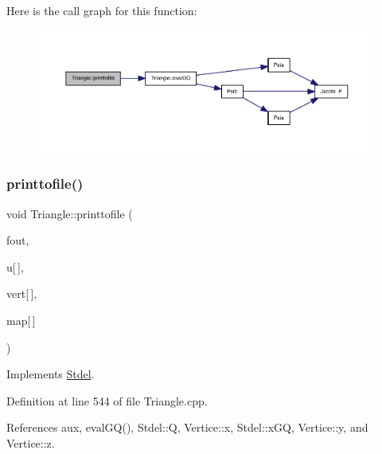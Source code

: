 Here is the call graph for this function\+:
\nopagebreak
\begin{figure}[H]
\begin{center}
\leavevmode
\includegraphics[width=350pt]{classTriangle_a404774b49104b12d072c9c103f9c357c_cgraph}
\end{center}
\end{figure}
\mbox{\label{classTriangle_ab95679ba1b3e20ac9e585ffe409f7972}} 
\subsubsection{\texorpdfstring{printtofile()}{printtofile()}\hspace{0.1cm}{\footnotesize\ttfamily [2/2]}}
{\footnotesize\ttfamily void Triangle\+::printtofile (\begin{DoxyParamCaption}\item[{F\+I\+LE $\ast$}]{fout,  }\item[{const double}]{u\mbox{[}$\,$\mbox{]},  }\item[{const \hyperlink{structVertice}{Vertice}}]{vert\mbox{[}$\,$\mbox{]},  }\item[{const int}]{map\mbox{[}$\,$\mbox{]} }\end{DoxyParamCaption})\hspace{0.3cm}{\ttfamily [virtual]}}



Implements \hyperlink{classStdel_a6863f8aeb8e4fb01299b109b0dd3fe13}{Stdel}.



Definition at line 544 of file Triangle.\+cpp.



References aux, eval\+G\+Q(), Stdel\+::Q, Vertice\+::x, Stdel\+::x\+GQ, Vertice\+::y, and Vertice\+::z.

